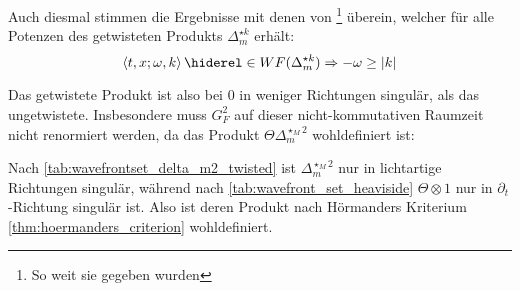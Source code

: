 Auch diesmal stimmen die Ergebnisse mit denen von \textcite[Prop. 3.72]{Schulz2014}\footnote{So weit sie gegeben wurden} überein, welcher für alle Potenzen des getwisteten Produkts $\Delta_m^{\star k}$ erhält:
\begin{equation*}
\left\langle t,x; \omega, k \right\rangle \hiderel\in WF(\Delta_m^{\star k})
\Rightarrow
- \omega \geq |k|
\end{equation*}

Das getwistete Produkt ist also bei $0$ in weniger Richtungen singulär, als das ungetwistete. Insbesondere muss $G_F^2$ auf dieser nicht-kommutativen Raumzeit nicht renormiert werden, da das Produkt $\Theta \Delta_m^{\star_M 2}$ wohldefiniert ist:

\begin{corollary}
Nach \cref{tab:wavefrontset_delta_m2_twisted} ist $\Delta_m^{\star_M 2}$ nur in lichtartige Richtungen singulär, während nach \cref{tab:wavefront_set_heaviside} $\Theta\otimes 1$ nur in $\partial_t$-Richtung singulär ist. Also ist deren Produkt nach Hörmanders Kriterium \cref{thm:hoermanders_criterion} wohldefiniert.
\end{corollary}



